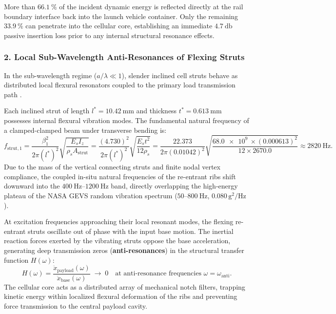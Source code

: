 More than $\SI{66.1}{\percent}$ of the incident dynamic energy is reflected directly at the rail boundary interface back into the launch vehicle container. Only the remaining $\SI{33.9}{\percent}$ can penetrate into the cellular core, establishing an immediate $\SI{4.7}{\decibel}$ passive insertion loss prior to any internal structural resonance effects.

\subsubsection{2. Local Sub-Wavelength Anti-Resonances of Flexing Struts}
In the sub-wavelength regime ($a/\lambda \ll 1$), slender inclined cell struts behave as distributed local flexural resonators coupled to the primary load transmission path \cite{hussein2014}.

Each inclined strut of length $l^* = \SI{10.42}{\milli\meter}$ and thickness $t^* = \SI{0.613}{\milli\meter}$ possesses internal flexural vibration modes. The fundamental natural frequency of a clamped-clamped beam under transverse bending is:
\begin{equation}
f_{\text{strut},1} = \frac{\beta_1^2}{2\pi (l^*)^2} \sqrt{\frac{E_s I_z}{\rho_s A_{\text{strut}}}} = \frac{(4.730)^2}{2\pi (l^*)^2} \sqrt{\frac{E_s t^2}{12 \rho_s}} = \frac{22.373}{2\pi (0.01042)^2} \sqrt{\frac{\SI{68.0e9}{} \times (0.000613)^2}{12 \times 2670.0}} \approx \SI{2820}{\hertz}.
\label{eq:strut_frequency}
\end{equation}
Due to the mass of the vertical connecting struts and finite nodal vertex compliance, the coupled in-situ natural frequencies of the re-entrant ribs shift downward into the $\SIrange{400}{1200}{\hertz}$ band, directly overlapping the high-energy plateau of the NASA GEVS random vibration spectrum ($50\text{--}\SI{800}{\hertz}$, $0.080\,\text{g}^2/\text{Hz}$).

At excitation frequencies approaching their local resonant modes, the flexing re-entrant struts oscillate out of phase with the input base motion. The inertial reaction forces exerted by the vibrating struts oppose the base acceleration, generating deep transmission zeros (\textbf{anti-resonances}) in the structural transfer function $H(\omega)$:
\begin{equation}
H(\omega) = \frac{\ddot{x}_{\text{payload}}(\omega)}{\ddot{x}_{\text{base}}(\omega)} \;\longrightarrow\; 0 \quad \text{at anti-resonance frequencies } \omega = \omega_{\text{anti}}.
\label{eq:transfer_function_zero}
\end{equation}
The cellular core acts as a distributed array of mechanical notch filters, trapping kinetic energy within localized flexural deformation of the ribs and preventing force transmission to the central payload cavity.

